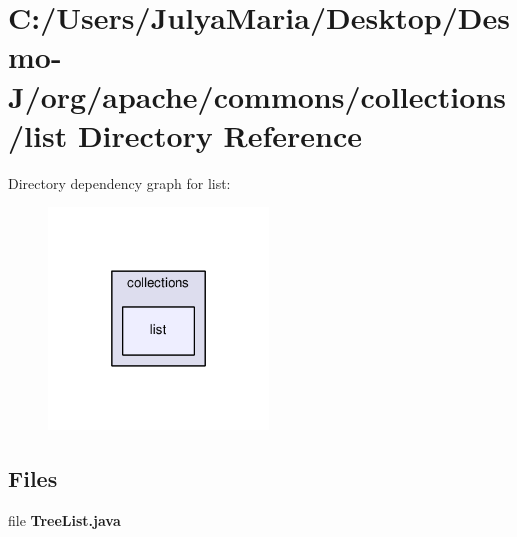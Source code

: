 \section{C\-:/\-Users/\-Julya\-Maria/\-Desktop/\-Desmo-\/\-J/org/apache/commons/collections/list Directory Reference}
\label{dir_3fb28306ca9abd18e3bde2147316b27a}
Directory dependency graph for list\-:
\nopagebreak
\begin{figure}[H]
\begin{center}
\leavevmode
\includegraphics[width=166pt]{dir_3fb28306ca9abd18e3bde2147316b27a_dep}
\end{center}
\end{figure}
\subsection*{Files}
\begin{DoxyCompactItemize}
\item 
file {\bfseries Tree\-List.\-java}
\end{DoxyCompactItemize}
